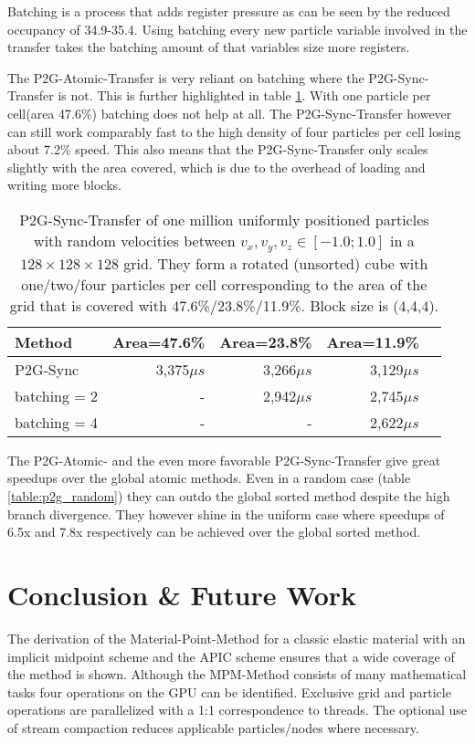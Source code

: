 \documentclass[m,times]{cgMA}
\begin{document}
Batching is a process that adds register pressure as can be seen by the reduced occupancy of 34.9-35.4. Using batching every new particle variable involved in the transfer takes the batching amount of that variables size more registers.

The P2G-Atomic-Transfer is very reliant on batching where the P2G-Sync-Transfer is not. This is further highlighted in table \ref{table:p2g_area}. With one particle per cell(area 47.6\%) batching does not help at all. The P2G-Sync-Transfer however can still work comparably fast to the high density of four particles per cell losing about 7.2\% speed. This also means that the P2G-Sync-Transfer only scales slightly with the area covered, which is due to the overhead of loading and writing more blocks.

\begin{table}[htpb]
  \begin{tabular}{ | l | r | r | r | r |}    \hline
    Method                 &  Area=47.6\% & Area=23.8\% &Area=11.9\%\\\hline
    P2G-Sync		   &  3,375$\mu s$& 3,266$\mu s$ & 3,129$\mu s$\\\hline
    batching = 2           & -&2,942$\mu s$ & 2,745$\mu s$\\\hline
    batching = 4           & -&- &2,622$\mu s$\\\hline
 \end{tabular}
 \caption{P2G-Sync-Transfer of one million uniformly positioned particles with random velocities between $v_x,v_y,v_z \in [-1.0;1.0]$ in a $128\times 128\times128$ grid. They form a rotated (unsorted) cube with one/two/four particles per cell corresponding to the area of the grid that is covered with 47.6\%/23.8\%/11.9\%. Block size is (4,4,4).}
 \label{table:p2g_area}
\end{table}
The P2G-Atomic- and the even more favorable P2G-Sync-Transfer give great speedups over the global atomic methods. Even in a random case (table \ref{table:p2g_random}) they can outdo the global sorted method despite the high branch divergence. They however shine in the uniform case where speedups of 6.5x and 7.8x respectively can be achieved over the global sorted method.
\section{Conclusion \& Future Work}\label{sec:conclusion}
The derivation of the Material-Point-Method for a classic elastic material with an implicit midpoint scheme and the APIC scheme ensures that a wide coverage of the method is shown. Although the MPM-Method consists of many mathematical tasks four operations on the GPU can be identified. Exclusive grid and particle operations are parallelized with a 1:1 correspondence to threads. The optional use of stream compaction reduces applicable particles/nodes where necessary.
\end{document}
